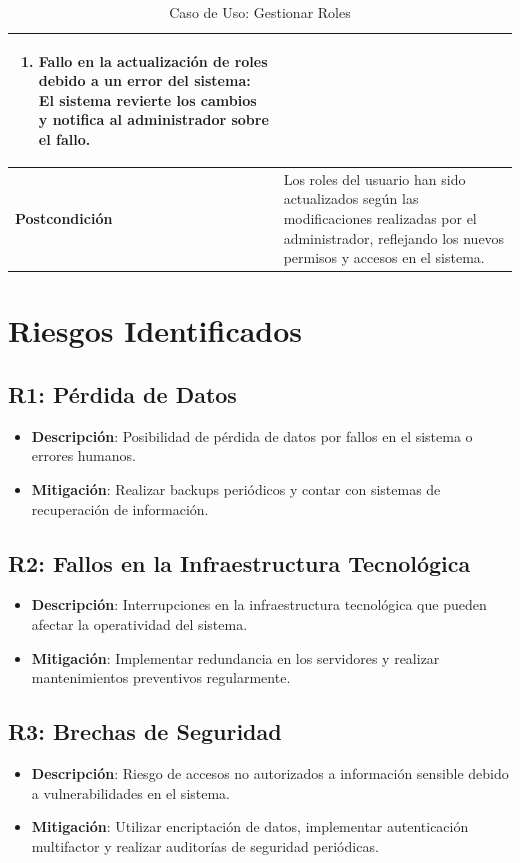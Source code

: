 \documentclass{article}
\begin{document}
\begin{table}[H]
\begin{tabular}{|p{4cm}|p{11cm}|}
\begin{enumerate}
        \item Fallo en la actualización de roles debido a un error del sistema: El sistema revierte los cambios y notifica al administrador sobre el fallo.
    \end{enumerate} \\ \hline
    \textbf{Postcondición}      & Los roles del usuario han sido actualizados según las modificaciones realizadas por el administrador, reflejando los nuevos permisos y accesos en el sistema. \\ \hline
    \end{tabular}
    \caption{Caso de Uso: Gestionar Roles}
    \label{tab:gestionar_roles}
\end{table}

\newpage
\section{Riesgos Identificados}

\subsection{R1: Pérdida de Datos}
\begin{itemize}
    \item \textbf{Descripción}: Posibilidad de pérdida de datos por fallos en el sistema o errores humanos.
    \item \textbf{Mitigación}: Realizar backups periódicos y contar con sistemas de recuperación de información.
\end{itemize}

\subsection{R2: Fallos en la Infraestructura Tecnológica}
\begin{itemize}
    \item \textbf{Descripción}: Interrupciones en la infraestructura tecnológica que pueden afectar la operatividad del sistema.
    \item \textbf{Mitigación}: Implementar redundancia en los servidores y realizar mantenimientos preventivos regularmente.
\end{itemize}

\subsection{R3: Brechas de Seguridad}
\begin{itemize}
    \item \textbf{Descripción}: Riesgo de accesos no autorizados a información sensible debido a vulnerabilidades en el sistema.
    \item \textbf{Mitigación}: Utilizar encriptación de datos, implementar autenticación multifactor y realizar auditorías de seguridad periódicas.
\end{itemize}
\end{document}

